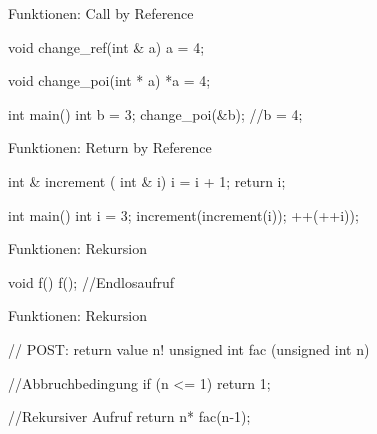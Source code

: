 \ifnum\conditionmacro=1 \documentclass[handout,usenames,dvipsnames]{beamer}\fi
\begin{document}
\begin{frame}[fragile]{Funktionen: Call by Reference}
\begin{TPCpp}
void change_ref(int & a){
	a = 4;
}

void change_poi(int * a){
	*a = 4;
}
\end{TPCpp}

\begin{TPCpp}
int main(){
	int b = 3;
	change_poi(&b); //b = 4;
}
\end{TPCpp}
\end{frame}


\begin{frame}[fragile]{Funktionen: Return by Reference}
\begin{TPCpp}
int & increment ( int & i){
	i = i + 1;
	return i;
}
\end{TPCpp}

\begin{TPCpp}
int main(){
	int i = 3;
	increment(increment(i));
	++(++i));
}
\end{TPCpp}
\end{frame}


\begin{frame}[fragile]{Funktionen: Rekursion}
\begin{TPCpp}
void f(){
	f(); //Endlosaufruf
}
\end{TPCpp}
\end{frame}

\begin{frame}[fragile]{Funktionen: Rekursion}
\begin{TPCpp}
// POST: return value n!
unsigned int fac (unsigned int n)
{
	//Abbruchbedingung
	if (n <= 1) return 1;
	
	//Rekursiver Aufruf
	return n* fac(n-1);
}
\end{TPCpp}
\end{frame}
\end{document}
